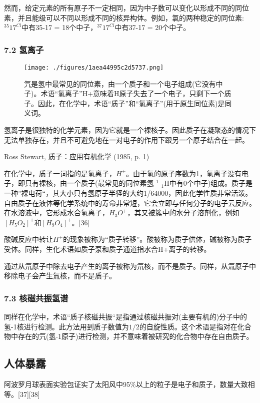 然而，给定元素的所有原子不一定相同，因为中子数可以变化以形成不同的同位素，并且能级可以不同以形成不同的核异构体。例如，氯的两种稳定的同位素:$^{35}17^{Cl}$中有35-17 = 18个中子，$^{37}17^{Cl}$中有37-17 = 20个中子。

\subsubsection{7.2 氢离子}
\begin{figure}[ht]
\centering
\texttt{[image: ./figures/1aea44995c2d5737.png]}
\caption{氕是氢中最常见的同位素，由一个质子和一个电子组成(它没有中子)。术语“氢离子”H+意味着H原子失去了一个电子，只剩下一个质子。因此，在化学中，术语“质子”和“氢离子”(用于原生同位素)是同义词。} \label{fig_Proton_6}
\end{figure}
氢离子是很独特的化学元素，因为它就是一个裸核子。因此质子在凝聚态的情况下无法单独存在，并且不可避免地在一对电子的作用下跟另一个原子结合在一起。

Ross Stewart, 质子：应用有机化学 (1985, p. 1)

在化学中，质子一词指的是氢离子，$H^+$。由于氢的原子序数为1，氢离子没有电子，即只有裸核，由一个质子(最常见的同位素氢 $^1$ $_1\text{H}$中有0个中子)组成。质子是一种”裸电荷“，其大小只有氢原子半径的大约1/64000，因此化学性质非常活泼。自由质子在液体等化学系统中的寿命非常短，它会立即与任何分子的电子云反应。在水溶液中，它形成水合氢离子，$H_3O^+$，其又被簇中的水分子溶剂化，例如$[H_5O_2]^+\text{和}[H_9O_4]^+$。[36]

酸碱反应中转让$H^+$的现象被称为“质子转移”。酸被称为质子供体，碱被称为质子受体。同样，生化术语如质子泵和质子通道指水合H+离子的转移。

通过从氘原子中除去电子产生的离子被称为氘核，而不是质子。同样，从氚原子中移除电子会产生氚核，而不是质子。

\subsubsection{7.3 核磁共振氢谱}
同样在化学中，术语“质子核磁共振“是指通过核磁共振对(主要有机的)分子中的氢-1核进行检测。此方法用到质子数值为$1/2$的自旋性质。这个术语是指对在化合物中存在的氕(氢-1原子)进行检测，并不意味着被研究的化合物中存在自由质子。

\subsection{人体暴露}
阿波罗月球表面实验包证实了太阳风中95\%以上的粒子是电子和质子，数量大致相等。[37][38]

